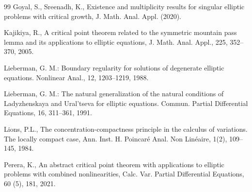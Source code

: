 \documentclass[12pt]{extarticle}
\theoremstyle{definition}
\theoremstyle{remark}
\theoremstyle{definition}
\numberwithin{equation}{section}
\numberwithin{equation}{section}
\begin{document}
{\begin{thebibliography}{99}
 Goyal, S., Sreenadh, K., Existence and multiplicity results for singular elliptic problems with critical growth, J. Math. Anal. Appl. (2020).



%			
%			
%			
			
%			
%			
%			
%			


 Kajikiya, R., A critical point theorem related to the symmetric mountain pass lemma and its applications to elliptic equations, J. Math. Anal. Appl., 225, 352--370, 2005.  



Lieberman, G. M.: Boundary regularity for solutions of degenerate elliptic equations. Nonlinear Anal., 12, 1203--1219, 1988.

Lieberman, G. M.: The natural generalization of the natural conditions of Ladyzhenskaya and Ural'tseva for elliptic equations. Commun. Partial Differential Equations, 16, 311--361, 1991.



 Lions, P.L., The concentration-compactness principle in the calculus of variations. The locally compact case,  Ann. Inst. H. Poincaré Anal. Non Linéaire, 1(2), 109--145, 1984.

%			
			
			 Perera, K., An abstract critical point theorem with applications to elliptic problems with combined nonlinearities, Calc. Var. Partial Differential Equations, 60 (5), 181, 2021.
			

\end{thebibliography}}
\end{document}
